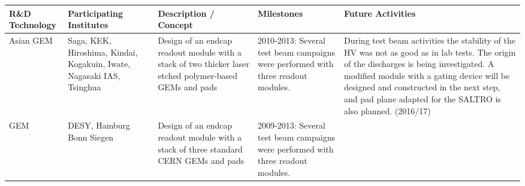 \thispagestyle{empty}
\begin{landscape}
    \centering
    \begin{adjustbox}{max width=1.1\textwidth,totalheight=1\textheight}
\begin{tabularx}{2.5\textheight}{lXXXX}
    \toprule
    R\&D Technology & Participating Institutes & Description / Concept & Milestones & Future Activities \\
    \midrule
        Asian GEM &
        Saga, KEK, Hiroshima, \newline Kindai, Kogakuin, Iwate, \newline
    Nagasaki IAS, Tsinghua &Design of an endcap readout module with a stack of
    two thicker laser etched polymer-based GEMs and pads  & 2010-2013: Several
    test beam campaigns were performed with three readout modules. & During test beam activities the stability of the HV was not
as good as in lab tests. The origin of the discharges is being
investigated. A modified module with a gating device will be
designed and constructed in the next step, and pad
plane adapted for the SALTRO is also planned. (2016/17) \\
    \midrule
        GEM &
        DESY, Hamburg \newline Bonn \newline Siegen &
        Design of an endcap readout module with a stack
of three standard CERN GEMs and pads&2009-2013: Several test beam campaigns were performed with
three readout modules.


\end{tabularx}
\end{adjustbox}
\end{landscape}
